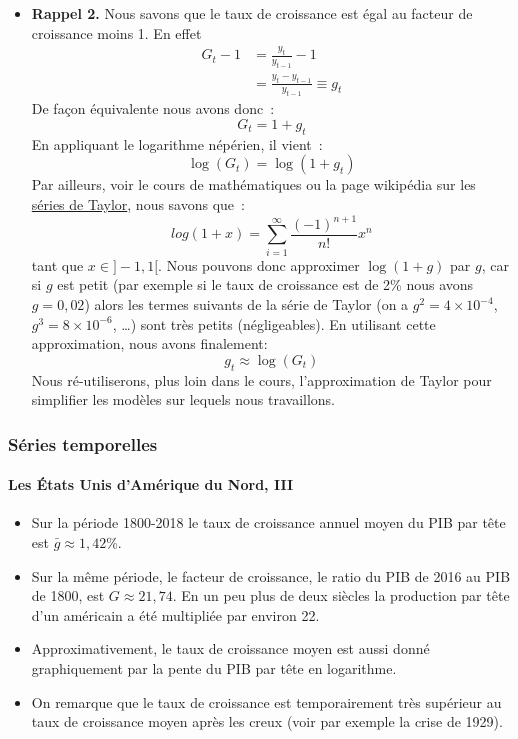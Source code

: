 \documentclass[10pt,notheorems]{beamer}
\theoremstyle{plain}
\theoremstyle{definition} %
\newenvironment{notes}
{\bgroup \justifying\bgroup\tiny\begin{spacing}{1.0}}
  {\end{spacing}\egroup\egroup}
\begin{document}
\begin{notes}
  \begin{itemize}

  \item \textbf{Rappel 2.} Nous savons que le taux de croissance est égal au facteur de croissance moins 1. En effet
    \[
      \begin{split}
        G_t-1 &= \frac{y_t}{y_{t-1}}-1\\
        &= \frac{y_t-y_{t-1}}{y_{t-1}} \equiv g_t
      \end{split}
    \]
    De façon équivalente nous avons donc~:
    \[
      G_t = 1+g_t
    \]
    En appliquant le logarithme népérien, il vient~:
    \[
      \log (G_t) = \log(1+g_t)
    \]
    Par ailleurs, voir le cours de mathématiques ou la page wikipédia sur les \href{https://fr.wikipedia.org/wiki/S%C3%A9rie_de_Taylor}{séries de Taylor}, nous savons que~:
    \[
      log(1+x) = \sum_{i=1}^{\infty}\frac{(-1)^{n+1}}{n!}x^n
    \]
    tant que $x\in]-1,1[$. Nous pouvons donc approximer $\log(1+g)$ par $g$, car si $g$ est petit (par exemple si le taux de croissance est de 2\% nous avons $g=0,02$) alors les termes suivants de la série de Taylor (on a $g^2=4\times 10^{-4}$, $g^3 = 8\times 10^{-6}$, \ldots) sont très petits (négligeables). En utilisant cette approximation, nous avons finalement:
    \[
      g_t \approx \log(G_t)
    \]
    Nous ré-utiliserons, plus loin dans le cours, l'approximation de Taylor pour simplifier les modèles sur lequels nous travaillons.
  \end{itemize}
\end{notes}



\begin{frame}
  \frametitle{Séries temporelles}
  \framesubtitle{Les États Unis d'Amérique du Nord, III}

  \begin{itemize}
  \item Sur la période 1800-2018 le taux de croissance annuel moyen du PIB par tête est $\bar g \approx 1,42\%$.\newline

  \item Sur la même période, le facteur de croissance, le ratio du PIB de 2016 au PIB de 1800, est $G \approx 21,74$. En un peu plus de deux siècles la production par tête d'un américain a été multipliée par environ 22.\newline

  \item Approximativement, le taux de croissance moyen est aussi donné graphiquement par la pente du PIB par tête en logarithme.\newline

  \item On remarque que le taux de croissance est temporairement très supérieur au taux de croissance moyen après les creux (voir par exemple la crise de 1929).\newline
  \end{itemize}

\end{frame}
\end{document}
